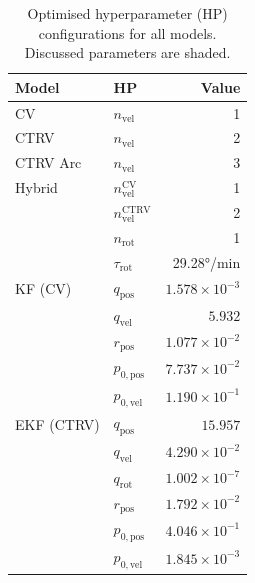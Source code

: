 \begin{table}[t]
\noindent
\caption[Exp. I Optimised Hyperparameter Configurations]{Optimised hyperparameter (HP) configurations for all models. Discussed parameters are shaded.}
\label{tab:hpo_results_exp0}
\begin{minipage}[t]{0.49\textwidth}
\centering
\begin{tabular}{llr}
\toprule
\textbf{Model} & \textbf{HP} & \textbf{Value} \\
\midrule
CV             & \cellcolor{blue!15}$n_\text{vel}$  & \cellcolor{blue!15}1 \\
CTRV           & $n_\text{vel}$                     & 2 \\
CTRV Arc       & $n_\text{vel}$                     & 3 \\
Hybrid         & $n_\text{vel}^\text{CV}$            & 1 \\
               & $n_\text{vel}^\text{CTRV}$          & 2 \\
               & $n_\text{rot}$                      & 1 \\
               & \cellcolor{blue!15}$\tau_\text{rot}$& \cellcolor{blue!15}29.28°/min \\
\midrule
KF (CV)        & \cellcolor{cyan!15}$q_\text{pos}$  & \cellcolor{cyan!15}$1.578{\times}10^{-3}$ \\
               & $q_\text{vel}$                     & $5.932$ \\
               & \cellcolor{cyan!15}$r_\text{pos}$  & \cellcolor{cyan!15}$1.077{\times}10^{-2}$ \\
               & $p_{0,\text{pos}}$                 & $7.737{\times}10^{-2}$ \\
               & $p_{0,\text{vel}}$                 & $1.190{\times}10^{-1}$ \\
\midrule
EKF (CTRV)     & \cellcolor{green!15}$q_\text{pos}$ & \cellcolor{green!15}$15.957$ \\
               & $q_\text{vel}$                     & $4.290{\times}10^{-2}$ \\
               & \cellcolor{green!15}$q_\text{rot}$ & \cellcolor{green!15}$1.002{\times}10^{-7}$ \\
               & $r_\text{pos}$                     & $1.792{\times}10^{-2}$ \\
               & $p_{0,\text{pos}}$                 & $4.046{\times}10^{-1}$ \\
               & $p_{0,\text{vel}}$                 & $1.845{\times}10^{-3}$ \\

\end{tabular}
\end{minipage}
\end{table}
